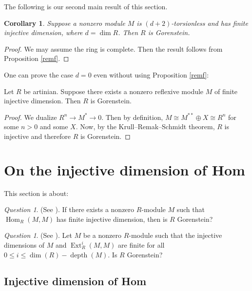 \documentclass[10. pt,a4paper]{amsart}
\newtheorem{corollary}[theorem]{Corollary}
\theoremstyle{definition}
\theoremstyle{remark}
\newtheorem{question}[theorem]{Question}
\newcommand{\Ext}{\operatorname{Ext}}
\newcommand{\Hom}{\operatorname{Hom}}
\newcommand{\depth}{\operatorname{depth}}
\begin{document}
The following is our second main result of this section.

\begin{corollary}
	Suppose a nonzero module $M$ is $(d+2)$-torsionless and has finite injective dimension, where $d = \dim R$. Then $R$ is Gorenstein.
\end{corollary}

\begin{proof}
	We may assume the ring is complete. Then the result follows from Proposition \ref{remf}.
\end{proof}

One can prove the case $d = 0$ even without using Proposition \ref{remf}:

\begin{fact}
	Let $R$ be artinian. Suppose there exists a nonzero reflexive module $M$ of finite injective dimension. Then $R$ is Gorenstein.
\end{fact}

\begin{proof}
	We dualize $R^n \to M^\ast \to 0$. Then by definition, $M \cong M^{\ast\ast} \oplus X \cong R^n$ for some $n > 0$ and some $X$. Now, by the Krull--Remak--Schmidt theorem, $R$ is injective and therefore $R$ is Gorenstein.
\end{proof}
\medskip

\section{On the injective dimension of Hom}

This section is about:

\begin{question}
	(See \cite[Question 2.18]{q1}). If there exists a nonzero $R$-module $M$ such that $\Hom_R(M,M)$ has finite injective dimension, then is $R$ Gorenstein?
\end{question}

\begin{question}
	(See \cite[Question 4.9]{q2}). Let $M$ be a nonzero $R$-module such that the injective dimensions of $M$ and $\Ext^i_R(M,M)$ are finite for all $0 \leq i \leq \dim(R) - \depth(M)$. Is $R$ Gorenstein?
\end{question}

\subsection{Injective dimension of Hom}
\end{document}
